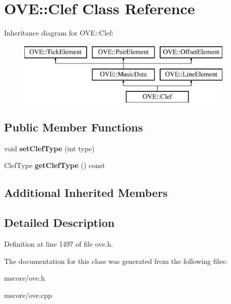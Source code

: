 \hypertarget{class_o_v_e_1_1_clef}{}\section{O\+VE\+:\+:Clef Class Reference}
\label{class_o_v_e_1_1_clef}
Inheritance diagram for O\+VE\+:\+:Clef\+:\begin{figure}[H]
\begin{center}
\leavevmode
\includegraphics[height=3.000000cm]{class_o_v_e_1_1_clef}
\end{center}
\end{figure}
\subsection*{Public Member Functions}
\begin{DoxyCompactItemize}
\item 
\mbox{\label{class_o_v_e_1_1_clef_a75ae1ac01b599d1c27fdcdbd38ca214b}} 
void {\bfseries set\+Clef\+Type} (int type)
\item 
\mbox{\label{class_o_v_e_1_1_clef_ad975453ba8d6bf4c30ce490f5f8039b8}} 
Clef\+Type {\bfseries get\+Clef\+Type} () const
\end{DoxyCompactItemize}
\subsection*{Additional Inherited Members}


\subsection{Detailed Description}


Definition at line 1497 of file ove.\+h.



The documentation for this class was generated from the following files\+:\begin{DoxyCompactItemize}
\item 
mscore/ove.\+h\item 
mscore/ove.\+cpp\end{DoxyCompactItemize}
